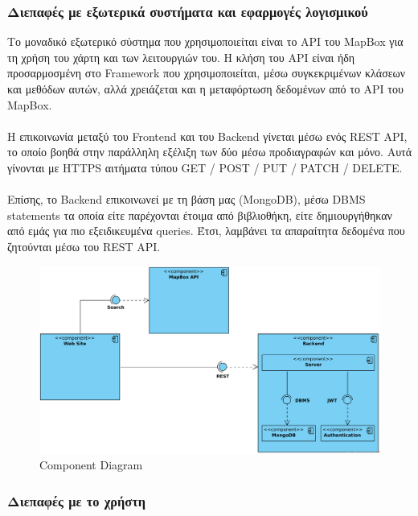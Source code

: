 \subsubsection{Διεπαφές με εξωτερικά συστήματα και εφαρμογές λογισμικού}
Το μοναδικό εξωτερικό σύστημα που χρησιμοποιείται είναι το API του MapBox για τη χρήση του χάρτη και των λειτουργιών του. Η κλήση του API είναι ήδη προσαρμοσμένη στο Framework που χρησιμοποιείται, μέσω συγκεκριμένων κλάσεων και μεθόδων αυτών, αλλά χρειάζεται και η μεταφόρτωση δεδομένων από το API του MapBox.\\ \hfill \\
Η επικοινωνία μεταξύ του Frontend και του Backend γίνεται μέσω ενός REST API, το οποίο βοηθά στην παράλληλη εξέλιξη των δύο μέσω προδιαγραφών και μόνο. Αυτά γίνονται με HTTPS αιτήματα τύπου GET / POST / PUT / PATCH / DELETE.\\ \hfill \\
Επίσης, το Backend επικοινωνεί με τη βάση μας (MongoDB), μέσω DBMS statements τα οποία είτε παρέχονται έτοιμα από βιβλιοθήκη, είτε δημιουργήθηκαν από εμάς για πιο εξειδικευμένα queries. Έτσι, λαμβάνει τα απαραίτητα δεδομένα που ζητούνται μέσω του REST API.
\begin{figure}[H]
    \centering
    \includegraphics[width = \linewidth]{media/System/UI_Sys_Soft.png}
    \caption{Component Diagram}
    \label{fig:Component}
\end{figure}


\subsubsection{Διεπαφές με το χρήστη}



